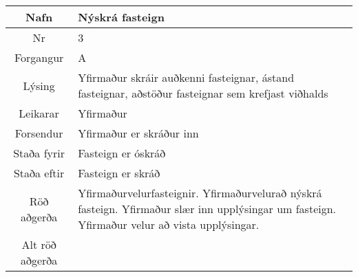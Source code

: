 \documentclass[a4paper]{article}
\begin{document}
\begin{tabular}{|c|p{10cm}|}
\hline
Nafn&Nýskrá fasteign\\
\hline
Nr&3\\
\hline
Forgangur&A\\
\hline
Lýsing&Yfirmaður skráir auðkenni fasteignar, ástand fasteignar, aðstöður fasteignar sem krefjast viðhalds\\
\hline
Leikarar&Yfirmaður\\
\hline
Forsendur&Yfirmaður er skráður inn\\
\hline
Staða fyrir&Fasteign er óskráð\\
\hline
Staða eftir&Fasteign er skráð\\
\hline
Röð aðgerða&Yfirmaðurvelurfasteignir. Yfirmaðurvelurað nýskrá fasteign. Yfirmaður slær inn upplýsingar um fasteign. Yfirmaður velur að vista upplýsingar.\\
\hline
Alt röð aðgerða&\\
\hline
\end{tabular}
\end{document}
